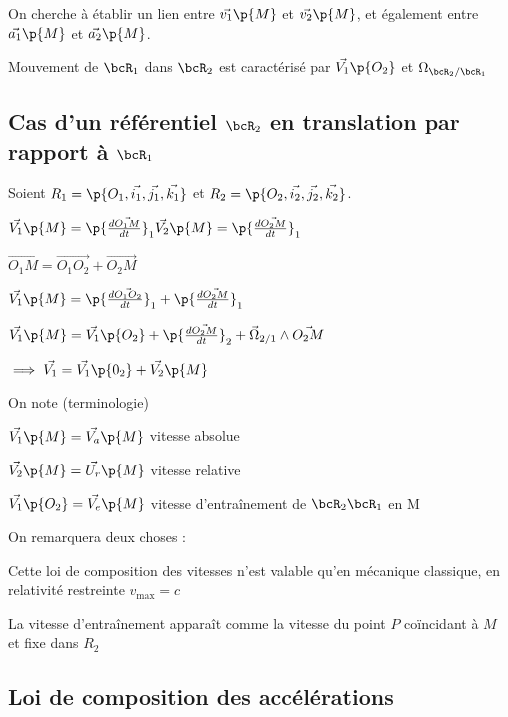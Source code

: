     On cherche à établir un lien entre $\vec{v_1}\p{M}$ et $\vec{v_2}\p{M}$, et également entre $\vec{a_1}\p{M}$ et $\vec{a_2}\p{M}$.
    
    Mouvement de $\bcR_1$ dans $\bcR_2$ est caractérisé par
    $\vec{V_1}\p{O_2}$ et $\Omega_{\bcR_2 / \bcR_1}$
    
    \subsection{Cas d'un référentiel $\bcR_2$ en translation par rapport à $\bcR_1$}
    
    Soient $R_1 = \p{O_1, \vec{i_1}, \vec{j_1}, \vec{k_1}}$ et $R_2 = \p{O_2, \vec{i_2}, \vec{j_2}, \vec{k_2}}$.
    
    \(\vec{V_1}\p{M} = \p{\frac{d\vec{O_1 M}}{dt}}_1
    \vec{V_2}\p{M} = \p{\frac{d\vec{O_2 M}}{dt}}_1\)
    
    $\vec{O_1 M} = \vec{O_1 O_2} + \vec{O_2 M}$
    
    $\vec{V_1} \p{M} = \p{\frac{d\vec{O_1 O_2}}{dt}}_1 + \p{\frac{d\vec{O_2 M}}{dt}}_1$
    
    $\vec{V_1}\p{M} = \vec{V_1}\p{O_2} + \p{\frac{d\vec{O_2 M}}{dt}}_2 + \vec{\Omega}_{2/1} \land \vec{O_2 M}$
    
    $\implies \vec{V_1} = \vec{V_1}\p{0_2} + \vec{V_2}\p{M}$
    
    On note (terminologie)
    \begin{enumerate}
        \itt $\vec{V_1}\p{M} = \vec{V_a}\p{M}$ vitesse absolue
        
        \itt $\vec{V_2}\p{M} = \vec{U_r}\p{M}$ vitesse relative
        
        \itt $\vec{V_1}\p{O_2} = \vec{V_e}\p{M}$ vitesse d'entraînement de $\bcR_2 \\ \bcR_1$ en M
    \end{enumerate}

    On remarquera deux choses :
    \begin{enumerate}
        \itt Cette loi de composition des vitesses n'est valable qu'en mécanique classique, en relativité restreinte \(v_\text{max} = c\)

        \itt La vitesse d'entraînement apparaît comme la vitesse du point \(P\) coïncidant à \(M\) et fixe dans \(R_2\)
    \end{enumerate}

  \subsection{Loi de composition des accélérations}

